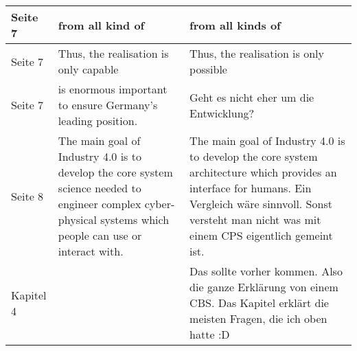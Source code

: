 \documentclass{article}
\begin{document}
\begin{tabularx}{\textwidth}{|l|X|X|}
    \hline
    Seite 7 & from all kind of & from all kinds of\\
    \hline
    Seite 7 & Thus, the realisation is only capable & Thus, the realisation is only possible\\
    \hline
    Seite 7 & is enormous important to ensure
    Germany’s leading position. & Geht es nicht eher um die Entwicklung?\\
    \hline
    Seite 8 & The main goal of Industry 4.0 is to develop the core system science needed to engineer
complex cyber-physical systems which people can use or interact with. & The main goal of Industry 4.0 is to develop the core system architecture which provides an interface for humans. Ein Vergleich wäre sinnvoll. Sonst versteht man nicht was mit einem CPS eigentlich gemeint ist.\\
    \hline
    Kapitel 4 & & Das sollte vorher kommen. Also die ganze Erklärung von einem CBS. Das Kapitel erklärt die meisten Fragen, die ich oben hatte :D\\ 
    \hline
    
    


\end{tabularx}
\end{document}
